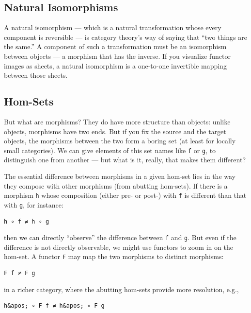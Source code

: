 \subsection{Natural Isomorphisms}\label{natural-isomorphisms}

A natural isomorphism --- which is a natural transformation whose every
component is reversible --- is category theory's way of saying that
``two things are the same.'' A component of such a transformation must
be an isomorphism between objects --- a morphism that has the inverse.
If you visualize functor images as sheets, a natural isomorphism is a
one-to-one invertible mapping between those sheets.

\subsection{Hom-Sets}\label{hom-sets}

But what are morphisms? They do have more structure than objects: unlike
objects, morphisms have two ends. But if you fix the source and the
target objects, the morphisms between the two form a boring set (at
least for locally small categories). We can give elements of this set
names like \texttt{f} or \texttt{g}, to distinguish one from another ---
but what is it, really, that makes them different?

The essential difference between morphisms in a given hom-set lies in
the way they compose with other morphisms (from abutting hom-sets). If
there is a morphism \texttt{h} whose composition (either pre- or post-)
with \texttt{f} is different than that with \texttt{g}, for instance:

\begin{verbatim}
h ∘ f ≠ h ∘ g
\end{verbatim}

then we can directly ``observe'' the difference between \texttt{f} and
\texttt{g}. But even if the difference is not directly observable, we
might use functors to zoom in on the hom-set. A functor \texttt{F} may
map the two morphisms to distinct morphisms:

\begin{verbatim}
F f ≠ F g
\end{verbatim}

in a richer category, where the abutting hom-sets provide more
resolution, e.g.,

\begin{verbatim}
h&apos; ∘ F f ≠ h&apos; ∘ F g
\end{verbatim}


